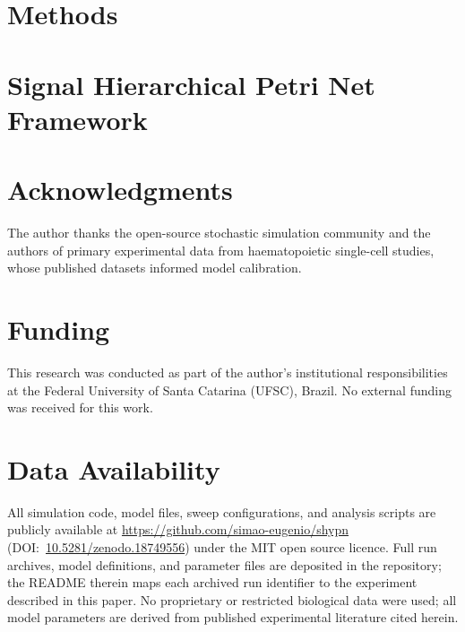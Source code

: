 \documentclass[10pt,letterpaper]{article}
\begin{document}
\section{Methods}
\label{sec:methods}


\section{Signal Hierarchical Petri Net Framework}
\label{sec:shpn}


\section*{Acknowledgments}

The author thanks the open-source stochastic simulation community and the
authors of primary experimental data from haematopoietic single-cell studies,
whose published datasets informed model calibration.

\section*{Funding}

This research was conducted as part of the author's institutional
responsibilities at the Federal University of Santa Catarina (UFSC), Brazil.
No external funding was received for this work.

\section*{Data Availability}

All simulation code, model files, sweep configurations, and analysis scripts
are publicly available at
\url{https://github.com/simao-eugenio/shypn}~\cite{shypn2026}
(DOI:~\href{https://doi.org/10.5281/zenodo.18749556}{10.5281/zenodo.18749556})
under the MIT open source licence. Full run archives, model definitions, and
parameter files are deposited in the repository; the README therein maps each
archived run identifier to the experiment described in this paper. No
proprietary or restricted biological data were used; all model parameters are
derived from published experimental literature cited herein.
\end{document}
